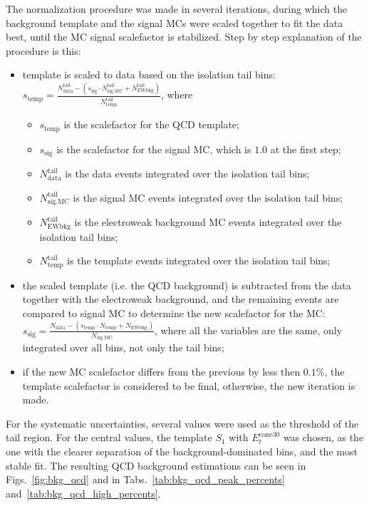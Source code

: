 The normalization procedure was made in several iterations, during which the background template and the signal MCs were scaled together to fit the data best, until the MC signal scalefactor is stabilized. Step by step explanation of the procedure is this:
\begin{itemize}
\item template is scaled to data based on the isolation tail bins: $s_{\mathrm{temp}} = \frac{N_{\mathrm{data}}^{\mathrm{tail}} - (s_{\mathrm{sig}} \cdot N_{\mathrm{sig.MC}}^{\mathrm{tail}}+N_{\mathrm{EWbkg}}^{\mathrm{tail}})}{N_{\mathrm{temp}}^{\mathrm{tail}}}$, where
\begin{itemize}
\item $s_{\mathrm{temp}}$ is the scalefactor for the QCD template;
\item $s_{\mathrm{sig}}$ is the scalefactor for the signal MC, which is $1.0$ at the first step;
\item $N_{\mathrm{data}}^{\mathrm{tail}}$ is the data events integrated over the isolation tail bins;
\item $N_{\mathrm{sig.MC}}^{\mathrm{tail}}$ is the signal MC events integrated over the isolation tail bins;
\item $N_{\mathrm{EWbkg}}^{\mathrm{tail}}$ is the electroweak background MC events integrated over the isolation tail bins;
\item $N_{\mathrm{temp}}^{\mathrm{tail}}$ is the template events integrated over the isolation tail bins;
\end{itemize}
\item the scaled template (i.e. the QCD background) is subtracted from the data together with the electroweak background, and the remaining events are compared to signal MC to determine the new scalefactor for the MC: $s_{\mathrm{sig}} = \frac{N_{\mathrm{data}} - (s_{\mathrm{temp}} \cdot N_{\mathrm{temp}} + N_{\mathrm{EWbkg}})}{N_{\mathrm{sig.MC}}}$, where all the variables are the same, only integrated over all bins, not only the tail bins;
\item if the new MC scalefactor differs from the previous by less then $0.1$\%, the template scalefactor is considered to be final, otherwise, the new iteration is made.
\end{itemize}

For the systematic uncertainties, several values were used as the threshold of the tail region. For the central values, the template $S_{1}$ with $E_{t}^{\mathrm{cone30}}$ was chosen, as the one with the clearer separation of the background-dominated bins, and the most stable fit. The resulting QCD background estimations can be seen in Figs.~\ref{fig:bkg_qcd} and in Tabs.~\ref{tab:bkg_qcd_peak_percents} and~\ref{tab:bkg_qcd_high_percents}.


